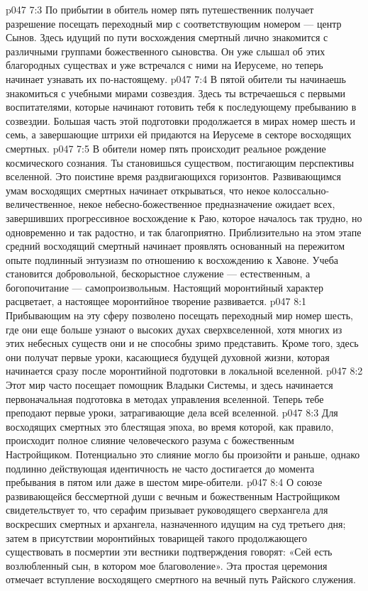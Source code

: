 \vs p047 7:3 По прибытии в обитель номер пять путешественник получает разрешение посещать переходный мир с соответствующим номером --- центр Сынов. Здесь идущий по пути восхождения смертный лично знакомится с различными группами божественного сыновства. Он уже слышал об этих благородных существах и уже встречался с ними на Иерусеме, но теперь начинает узнавать их по\hyp{}настоящему.
\vs p047 7:4 В пятой обители ты начинаешь знакомиться с учебными мирами созвездия. Здесь ты встречаешься с первыми воспитателями, которые начинают готовить тебя к последующему пребыванию в созвездии. Большая часть этой подготовки продолжается в мирах номер шесть и семь, а завершающие штрихи ей придаются на Иерусеме в секторе восходящих смертных.
\vs p047 7:5 В обители номер пять происходит реальное рождение космического сознания. Ты становишься существом, постигающим перспективы вселенной. Это поистине время раздвигающихся горизонтов. Развивающимся умам восходящих смертных начинает открываться, что некое колоссально\hyp{}величественное, некое небесно\hyp{}божественное предназначение ожидает всех, завершивших прогрессивное восхождение к Раю, которое началось так трудно, но одновременно и так радостно, и так благоприятно. Приблизительно на этом этапе средний восходящий смертный начинает проявлять основанный на пережитом опыте подлинный энтузиазм по отношению к восхождению к Хавоне. Учеба становится добровольной, бескорыстное служение --- естественным, а богопочитание --- самопроизвольным. Настоящий моронтийный характер расцветает, а настоящее моронтийное творение развивается.
\vs p047 8:1 Прибывающим на эту сферу позволено посещать переходный мир номер шесть, где они еще больше узнают о высоких духах сверхвселенной, хотя многих из этих небесных существ они и не способны зримо представить. Кроме того, здесь они получат первые уроки, касающиеся будущей духовной жизни, которая начинается сразу после моронтийной подготовки в локальной вселенной.
\vs p047 8:2 Этот мир часто посещает помощник Владыки Системы, и здесь начинается первоначальная подготовка в методах управления вселенной. Теперь тебе преподают первые уроки, затрагивающие дела всей вселенной.
\vs p047 8:3 \pc Для восходящих смертных это блестящая эпоха, во время которой, как правило, происходит полное слияние человеческого разума с божественным Настройщиком. Потенциально это слияние могло бы произойти и раньше, однако подлинно действующая идентичность не часто достигается до момента пребывания в пятом или даже в шестом мире\hyp{}обители.
\vs p047 8:4 \pc О союзе развивающейся бессмертной души с вечным и божественным Настройщиком свидетельствует то, что серафим призывает руководящего сверхангела для воскресших смертных и архангела, назначенного идущим на суд третьего дня; затем в присутствии моронтийных товарищей такого продолжающего существовать в посмертии эти вестники подтверждения говорят: «Сей есть возлюбленный сын, в котором мое благоволение». Эта простая церемония отмечает вступление восходящего смертного на вечный путь Райского служения.
